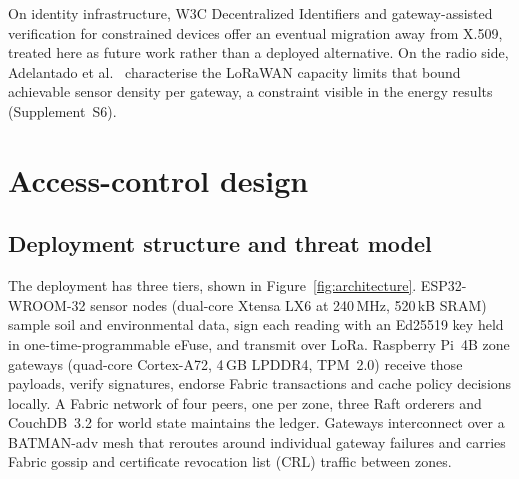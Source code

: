 \documentclass[a4paper,fleqn]{cas-sc}
\begin{document}
On identity infrastructure, W3C Decentralized Identifiers
\cite{w3c_did_core} and gateway-assisted verification for constrained devices
\cite{ferdous2019ssi,tara2023decentralized} offer an eventual migration away
from X.509, treated here as future work rather than a deployed alternative.
On the radio side, Adelantado et al.\ \cite{adelantado2017understanding}
characterise the LoRaWAN capacity limits that bound achievable sensor density
per gateway, a constraint visible in the energy results (Supplement~S6).

\section{Access-control design}
\label{sec:design}

\subsection{Deployment structure and threat model}
\label{subsec:threat}

The deployment has three tiers, shown in Figure~\ref{fig:architecture}.
ESP32-WROOM-32 sensor nodes (dual-core Xtensa LX6 at 240\,MHz, 520\,kB SRAM)
sample soil and environmental data, sign each reading with an Ed25519 key
held in one-time-programmable eFuse, and transmit over LoRa. Raspberry Pi~4B
zone gateways (quad-core Cortex-A72, 4\,GB LPDDR4, TPM~2.0) receive those
payloads, verify signatures, endorse Fabric transactions and cache policy
decisions locally. A Fabric network of four peers, one per zone, three Raft
orderers and CouchDB~3.2 for world state maintains the ledger. Gateways
interconnect over a BATMAN-adv mesh \cite{batman2010} that reroutes around
individual gateway failures and carries Fabric gossip and certificate
revocation list (CRL) traffic between zones.
\end{document}
